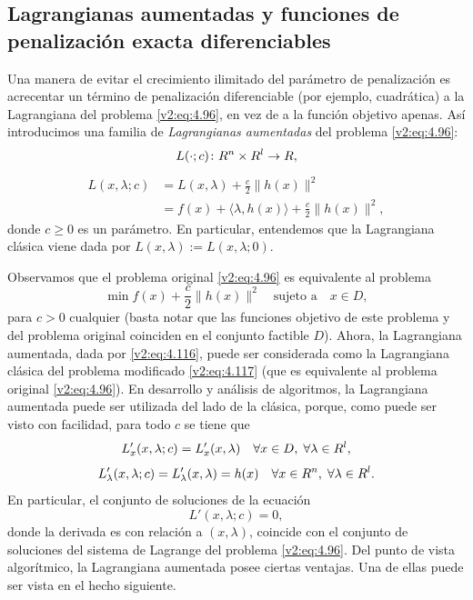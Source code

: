
\subsection{Lagrangianas aumentadas y funciones de penalización exacta diferenciables}\label{v2:sec:4.4.3}

Una manera de evitar el crecimiento ilimitado del parámetro de penalización es acrecentar un término de penalización diferenciable (por ejemplo, cuadrática) a la Lagrangiana del problema \eqref{v2:eq:4.96}, en vez de a la función objetivo apenas. Así introducimos una familia de \textit{Lagrangianas aumentadas} del problema \eqref{v2:eq:4.96}:
\[
    L(\cdot; c) \colon R^n \times R^l \to R,
\]
\begin{align}
    L(x, \lambda; c) &= L(x, \lambda) + \frac{c}{2}\|h(x)\|^2 \label{v2:eq:4.116} \\
    &= f(x) + \langle \lambda, h(x) \rangle + \frac{c}{2}\|h(x)\|^2, \nonumber
\end{align}
donde $c \ge 0$ es un parámetro. En particular, entendemos que la Lagrangiana clásica viene dada por $L(x, \lambda) := L(x, \lambda; 0)$.

Observamos que el problema original \eqref{v2:eq:4.96} es equivalente al problema
\begin{equation}
    \min f(x) + \frac{c}{2}\|h(x)\|^2 \quad \text{sujeto a} \quad x \in D,
    \label{v2:eq:4.117}
\end{equation}
para $c > 0$ cualquier (basta notar que las funciones objetivo de este problema y del problema original coinciden en el conjunto factible $D$). Ahora, la Lagrangiana aumentada, dada por \eqref{v2:eq:4.116}, puede ser considerada como la Lagrangiana clásica del problema modificado \eqref{v2:eq:4.117} (que es equivalente al problema original \eqref{v2:eq:4.96}). En desarrollo y análisis de algoritmos, la Lagrangiana aumentada puede ser utilizada del lado de la clásica, porque, como puede ser visto con facilidad, para todo $c$ se tiene que
\[
    L'_x(x, \lambda; c) = L'_x(x, \lambda) \quad \forall x \in D, \; \forall \lambda \in R^l,
\]
\[
    L'_\lambda(x, \lambda; c) = L'_\lambda(x, \lambda) = h(x) \quad \forall x \in R^n, \; \forall \lambda \in R^l.
\]
En particular, el conjunto de soluciones de la ecuación
\[
    L'(x, \lambda; c) = 0,
\]
donde la derivada es con relación a $(x, \lambda)$, coincide con el conjunto de soluciones del sistema de Lagrange del problema \eqref{v2:eq:4.96}. Del punto de vista algorítmico, la Lagrangiana aumentada posee ciertas ventajas. Una de ellas puede ser vista en el hecho siguiente.

